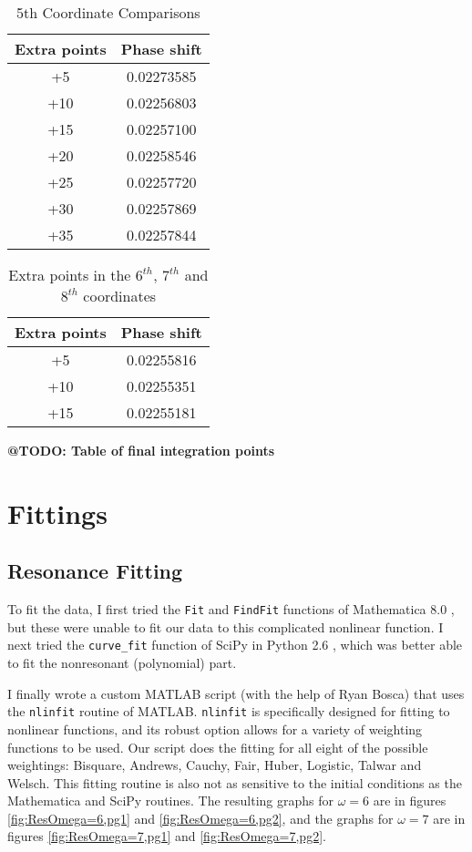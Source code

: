 \documentclass[Dissertation.tex]{subfiles}
\begin{document}
\begin{table}[H]
\centering
\begin{tabular}{c c}
\toprule
Extra points & Phase shift \\
\midrule
+5 & 0.02273585 \\
+10 & 0.02256803 \\
+15 & 0.02257100 \\
+20 & 0.02258546 \\
+25 & 0.02257720 \\
+30 & 0.02257869 \\
+35 & 0.02257844 \\
\bottomrule
\end{tabular}
\caption{5th Coordinate Comparisons}
\label{tab:5thcoordExtraPoints}
\end{table}


\begin{table}[H]
\centering
\begin{tabular}{c c}
\toprule
Extra points & Phase shift \\
\midrule
+5 & 0.02255816 \\
+10 & 0.02255351 \\
+15 & 0.02255181 \\
\bottomrule
\end{tabular}
\caption{Extra points in the $6^{th}$, $7^{th}$ and $8^{th}$ coordinates}
\label{tab:678thcoordExtraPoints}
\end{table}

\textbf{@TODO: Table of final integration points}


\section{Fittings}
\label{sec:Fittings}

\subsection{Resonance Fitting}
\label{sec:ResonanceFit}
To fit the data, I first tried the \texttt{Fit} and \texttt{FindFit} functions of Mathematica\textsuperscript{\textregistered} 8.0 \cite{Mathematica}, but these were unable to fit our data to this complicated nonlinear function. I next tried the \texttt{curve\_fit} function of SciPy \cite{SciPy} in Python\textsuperscript{\textregistered} 2.6 \cite{Python}, which was better able to fit the nonresonant (polynomial) part.

I finally wrote a custom MATLAB\textsuperscript{\textregistered} \cite{matlab} script (with the help of Ryan Bosca) that uses the \texttt{nlinfit} routine of MATLAB. \texttt{nlinfit} is specifically designed for fitting to nonlinear functions, and its robust option allows for a variety of weighting functions to be used. Our script does the fitting for all eight of the possible weightings: Bisquare, Andrews, Cauchy, Fair, Huber, Logistic, Talwar and Welsch. This fitting routine is also not as sensitive to the initial conditions as the Mathematica and SciPy routines. The resulting graphs for $\omega = 6$ are in figures \ref{fig:ResOmega=6,pg1} and \ref{fig:ResOmega=6,pg2}, and the graphs for $\omega = 7$ are in figures \ref{fig:ResOmega=7,pg1} and \ref{fig:ResOmega=7,pg2}.
\end{document}
